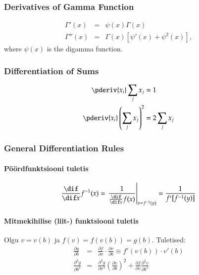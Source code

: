 \documentclass[a4paper]{article}
\numberwithin{equation}{subsection}
\begin{document}
\subsubsection{Derivatives of Gamma Function}
\begin{eqnarray}
\Gamma'(x) &=&
  \psi(x) \Gamma(x)\\
\Gamma''(x) &=&
  \Gamma(x) \left[ \psi'(x) + \psi^2(x) \right],
\end{eqnarray}
where $\psi(x)$ is the digamma function.


\subsubsection{Differentiation of Sums}
\begin{align}
  \pderiv{x_{i}}\sum_{j} x_{j} &= 1
  \\
  \pderiv{x_{i}} 
  \left( \sum_{j} x_{j} \right)^{2}
  &= 2 \sum_{j} x_{j}
\end{align}


\subsubsection{General Differentiation Rules}

\paragraph{Pöördfunktsiooni tuletis}
\begin{equation}
\frac{\dif}{\dif x} f^{-1}(x) = 
  \left. \frac{1}{\frac{\dif}{\dif x} f(x)} \right|_{x=f^{-1}(y)} =
  \frac{1}{f'[f^{-1}(y)]}
\end{equation}

\paragraph{Mitmekihilise (liit-) funktsiooni tuletis}
Olgu $v=v(b)$ ja $f(v) = f(v(b)) = g(b)$.  Tuletised:
\begin{eqnarray}
  \label{eq:mitmekihilise_tuletis}
  \frac{\partial g}{\partial b} &=& 
  \frac{\partial f}{\partial v} \cdot \frac{\partial v}{\partial b}
  \equiv
  f'(v(b)) \cdot v'(b)\\
  \frac{\partial^2 g}{\partial b^2} &=&
  \frac{\partial^2 g}{\partial v^2} 
  \left(\frac{\partial v}{\partial b} \right)^2 +
  \frac{\partial f}{\partial v}\frac{\partial^2 v}{\partial b^2}
\end{eqnarray}
\end{document}
